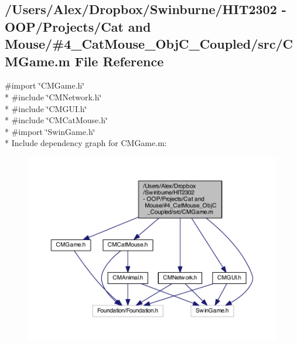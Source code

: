 \subsection{/\-Users/\-Alex/\-Dropbox/\-Swinburne/\-H\-I\-T2302 -\/ O\-O\-P/\-Projects/\-Cat and Mouse/\#4\-\_\-\-Cat\-Mouse\-\_\-\-Obj\-C\-\_\-\-Coupled/src/\-C\-M\-Game.m File Reference}
\label{_c_m_game_8m}
{\ttfamily \#import \char`\"{}C\-M\-Game.\-h\char`\"{}}\\*
{\ttfamily \#include \char`\"{}C\-M\-Network.\-h\char`\"{}}\\*
{\ttfamily \#include \char`\"{}C\-M\-G\-U\-I.\-h\char`\"{}}\\*
{\ttfamily \#include \char`\"{}C\-M\-Cat\-Mouse.\-h\char`\"{}}\\*
{\ttfamily \#import \char`\"{}Swin\-Game.\-h\char`\"{}}\\*
Include dependency graph for C\-M\-Game.\-m\-:
\nopagebreak
\begin{figure}[H]
\begin{center}
\leavevmode
\includegraphics[width=350pt]{_c_m_game_8m__incl}
\end{center}
\end{figure}
